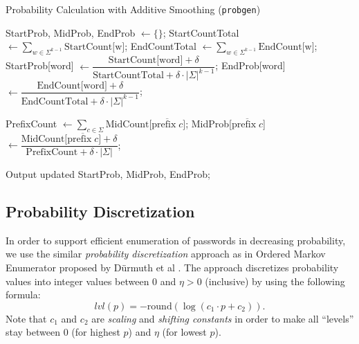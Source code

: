 \documentclass{article} %
\theoremstyle{definition}
\theoremstyle{theorem}
\theoremstyle{remark}
\theoremstyle{remark}
\begin{document}
\begin{algorithm}[!htbp]
    \caption{Probability Calculation with Additive Smoothing (\texttt{probgen})}
    \label{algo:probgen}
    \begin{algorithmic}

        \State
        \State StartProb, MidProb, EndProb $\gets \{\}$;
        \State
        \State StartCountTotal $\gets \sum_{w\in\Sigma^{k-1}}{\text{StartCount[w]}}$;
        \State EndCountTotal $\gets \sum_{w\in\Sigma^{k-1}}{\text{EndCount[w]}}$;
            \State StartProb[word] $\gets \dfrac{\text{StartCount[word]} + \delta}{\text{StartCountTotal} + \delta \cdot |\Sigma|^{k-1}}$;
            \State EndProb[word] $\gets \dfrac{\text{EndCount[word]} + \delta}{\text{EndCountTotal} + \delta \cdot |\Sigma|^{k-1}}$;
        \EndFor
        
        \State
            \State PrefixCount $\gets \sum_{c\in\Sigma}{\text{MidCount[$\overline{\text{prefix}\; c}$]}}$;
                \State MidProb[$\overline{\text{prefix}\; c}$] $\gets \dfrac{\text{MidCount[$\overline{\text{prefix}\; c}$]} + \delta}{\text{PrefixCount} + \delta\cdot |\Sigma|}$; 
            \EndFor
        \EndFor
        
        \State Output updated StartProb, MidProb, EndProb;
    \end{algorithmic}
\end{algorithm}

\subsection{Probability Discretization}
\par\quad In order to support efficient enumeration of passwords in decreasing probability, we use the similar \emph{probability discretization} approach as in Ordered Markov Enumerator proposed by D\"{u}rmuth et al \cite{omen}. The approach discretizes probability values into integer values between $0$ and $\eta > 0$ (inclusive) by using the following formula:
    \begin{equation}
        lvl(p) = -\text{round}(\log(c_1 \cdot p + c_2)).
    \end{equation}
Note that $c_1$ and $c_2$ are \emph{scaling} and \emph{shifting constants} in order to make all ``levels'' stay between $0$ (for highest $p$) and $\eta$ (for lowest $p$).
\end{document}
